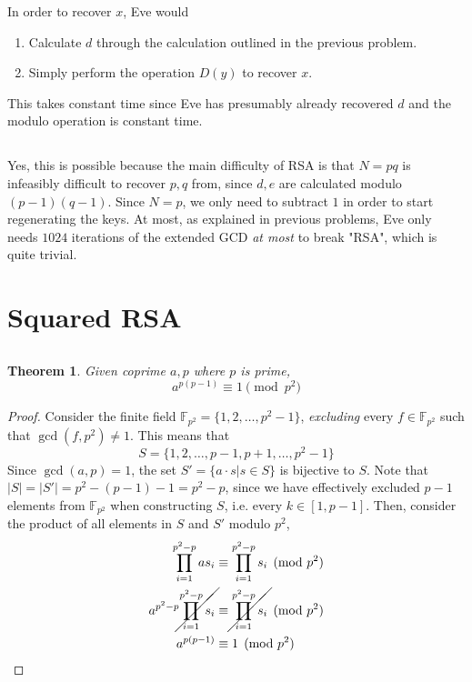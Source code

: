 \documentclass{article}
\newtheorem{theorem}{Theorem}
\begin{document}
In order to recover \(x\), Eve would
\begin{enumerate}
    \item Calculate \(d\) through the calculation outlined in the previous problem.
    \item Simply perform the operation \(D(y)\) to recover \(x\).
\end{enumerate}
This takes constant time since Eve has presumably already recovered \(d\) and the modulo operation is constant time.

\subsection{}

Yes, this is possible because the main difficulty of RSA is that \(N = pq\) is infeasibly difficult to recover \(p, q\) from, since \(d, e\) are calculated modulo \((p - 1) (q - 1)\).
Since \(N = p\), we only need to subtract \(1\) in order to start regenerating the keys.
At most, as explained in previous problems, Eve only needs \(1024\) iterations of the extended GCD \emph{at most} to break "RSA", which is quite trivial.

\section{Squared RSA}

\subsection{}

\begin{theorem} \label{thm:2a}
    Given coprime \(a, p\) where \(p\) is prime,
    \begin{equation}
        a^{p (p - 1)} \equiv 1 \pmod{p^2}
    \end{equation}
\end{theorem}
\begin{proof}
    Consider the finite field \(\mathbb{F}_{p^2} = \{1, 2, \ldots, p^2 - 1\}\), \emph{excluding} every \(f \in \mathbb{F}_{p^2}\) such that \(\gcd(f, p^2) \neq 1\).
    This means that
    \begin{equation}
        S = \{1, 2, \ldots, p - 1, p + 1, \ldots, p^2 - 1\}
    \end{equation}
    Since \(\gcd(a, p) = 1\), the set \(S' = \{a \cdot s | s \in S\}\) is bijective to \(S\).
    Note that \(|S| = |S'| = p^2 - (p - 1) - 1 = p^2 - p\), since we have effectively excluded \(p - 1\) elements from \(\mathbb{F}_{p^2}\) when constructing \(S\), i.e. every \(k \in [1, p - 1]\).
    Then, consider the product of all elements in \(S\) and \(S'\) modulo \(p^2\),
    \begin{align}
        \prod_{i = 1}^{p^2 - p} a s_i &\equiv \prod_{i = 1}^{p^2 - p} s_i \pmod{p^2} \\
        a^{p^2 - p} \cancel{\prod_{i = 1}^{p^2 - p} s_i} &\equiv \cancel{\prod_{i = 1}^{p^2 - p} s_i} \pmod{p^2} \\
        a^{p (p - 1)} &\equiv 1 \pmod{p^2}
    \end{align}
\end{proof}
\end{document}
